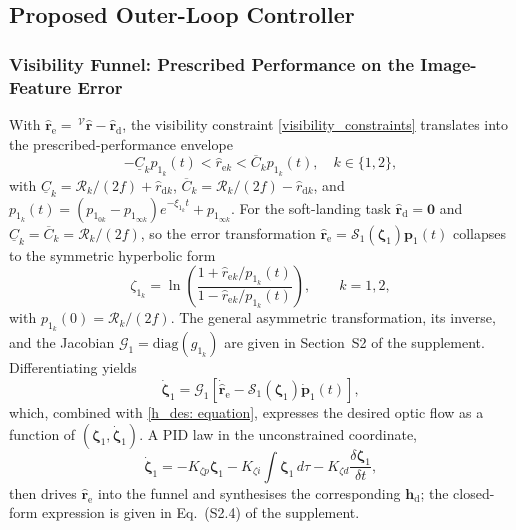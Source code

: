 \subsection{Proposed Outer-Loop Controller} \label{outer loop: section}

\subsubsection{Visibility Funnel: Prescribed Performance on the Image-Feature Error} \label{ppc visibility: section}
With $\hat{\boldsymbol{r}}_\text{e}=\,^\mathcal{V}\hat{\boldsymbol{r}}-\hat{\boldsymbol{r}}_\text{d}$, the visibility constraint \eqref{visibility_constraints} translates into the prescribed-performance envelope \cite{lin2022, salehi2021}
\begin{equation}
\label{prescribed perfromance: equation}
    -\underline{C}_{k} p_{1_k}(t) < \hat{r}_{\text{e}k} < \overline{C}_{k} p_{1_k}(t),\quad k\in\{1,2\},
\end{equation}
with $\underline{C}_k=\mathcal{R}_k/(2f)+\hat{r}_{\text{d}k}$, $\overline{C}_k=\mathcal{R}_k/(2f)-\hat{r}_{\text{d}k}$, and $p_{1_k}(t) = (p_{1_{0k}}-p_{1_{\infty k}})e^{-\xi_{1_k}t}+p_{1_{\infty k}}$. For the soft-landing task $\hat{\boldsymbol{r}}_\text{d}=\boldsymbol{0}$ and $\underline{C}_k=\overline{C}_k=\mathcal{R}_k/(2f)$, so the error transformation $\hat{\boldsymbol{r}}_\text{e}=\mathcal{S}_1(\boldsymbol{\zeta}_1)\boldsymbol{p}_1(t)$ collapses to the symmetric hyperbolic form
\begin{equation} \label{symmetric transformation: equation}
    \zeta_{1_k} = \ln\!\left(\frac{1 + \hat{r}_{\text{e}k}/p_{1_k}(t)}{1 - \hat{r}_{\text{e}k}/p_{1_k}(t)}\right),\qquad k=1,2,
\end{equation}
with $p_{1_k}(0)=\mathcal{R}_k/(2f)$. The general asymmetric transformation, its inverse, and the Jacobian $\mathcal{G}_1=\text{diag}(g_{1_k})$ are given in Section~S2 of the supplement. Differentiating yields
\begin{equation} \label{transformed error derivative: equation}
    \dot{\boldsymbol{\zeta}}_1 = \mathcal{G}_1\!\left[\dot{\hat{\boldsymbol{r}}}_{\text{e}} - \mathcal{S}_1(\boldsymbol{\zeta}_1)\dot{\boldsymbol{p}}_1(t)\right],
\end{equation}
which, combined with \eqref{h_des: equation}, expresses the desired optic flow as a function of $(\boldsymbol{\zeta}_1,\dot{\boldsymbol{\zeta}}_1)$. A PID law in the unconstrained coordinate,
\begin{equation} \label{zeta_e_dot_d: equation}
    \dot{\boldsymbol{\zeta}}_1 = -K_{\zeta p}\boldsymbol{\zeta}_1 - K_{\zeta i}\!\int\boldsymbol{\zeta}_1\,d\tau - K_{\zeta d}\frac{\delta\boldsymbol{\zeta}_1}{\delta t},
\end{equation}
then drives $\hat{\boldsymbol{r}}_\text{e}$ into the funnel and synthesises the corresponding $\boldsymbol{h}_\text{d}$; the closed-form expression is given in Eq.~(S2.4) of the supplement.

